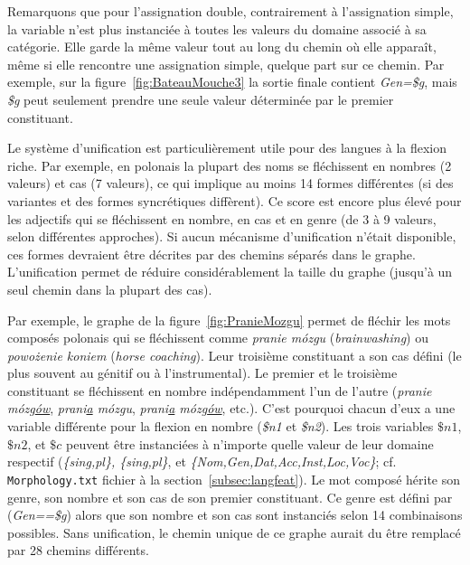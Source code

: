 \bigskip
\noindent Remarquons que pour l'assignation double, contrairement à l'assignation simple, la
variable n'est plus instanciée à toutes les valeurs du domaine associé à sa catégorie. Elle garde la
même valeur tout au long du chemin où elle apparaît, même si elle rencontre une assignation simple,
quelque part sur ce chemin. Par exemple, sur la figure~\ref{fig:BateauMouche3} la sortie finale
contient \emph{Gen=\$g}, mais \emph{\$g} peut seulement prendre une seule valeur
déterminée par le premier constituant.

\bigskip
\noindent Le système d'unification est particulièrement utile pour des langues à la flexion riche.
Par exemple, en polonais la plupart des noms se fléchissent en nombres (2 valeurs) et cas (7
valeurs), ce qui implique au moins 14 formes différentes (si des variantes et des formes
syncrétiques diffèrent).
Ce score est encore plus élevé pour les adjectifs qui se fléchissent en nombre, en cas et en genre
(de 3 à 9 valeurs, selon différentes approches). Si aucun mécanisme d'unification n'était
disponible, ces formes devraient être décrites par des chemins séparés dans le graphe.
L'unification permet de réduire considérablement la taille du graphe (jusqu'à un seul chemin dans la
plupart des cas).

\bigskip
\noindent Par exemple, le graphe de la figure~\ref{fig:PranieMozgu} permet de fléchir les mots
composés polonais qui se fléchissent comme \emph{pranie m\'ozgu} (\emph{brainwashing}) ou
\emph{powo\.zenie koniem} (\emph{horse coaching}). Leur troisième constituant a son cas défini
(le plus souvent au génitif ou à l'instrumental). Le premier et le troisième constituant se
fléchissent en nombre indépendamment l'un de l'autre  (\emph{pranie m\'ozg\underline{\'ow}},
\emph{prani\underline{a} m\'ozgu}, \emph{prani\underline{a} m\'ozg\underline{\'ow}}, etc.).
C'est pourquoi chacun d'eux a une variable différente pour la flexion en nombre  (\emph{\$n1} et
\emph{\$n2}). Les trois variables $\$n1$, $\$n2$, et $\$c$ peuvent être instanciées à n'importe
quelle valeur de leur domaine respectif  (\emph{\{sing,pl\}, \{sing,pl\}}, et
\emph{\{Nom,Gen,Dat,Acc,Inst,Loc,Voc\}}; cf. \verb+Morphology.txt+ fichier à la
section~\ref{subsec:langfeat}).
Le mot composé hérite son genre, son nombre et son cas de son premier constituant. Ce genre est
défini par (\emph{Gen==\$g}) alors que son nombre et son cas sont instanciés selon 14 combinaisons
possibles. Sans unification, le chemin unique de ce graphe aurait du être remplacé par 28 chemins
différents.


